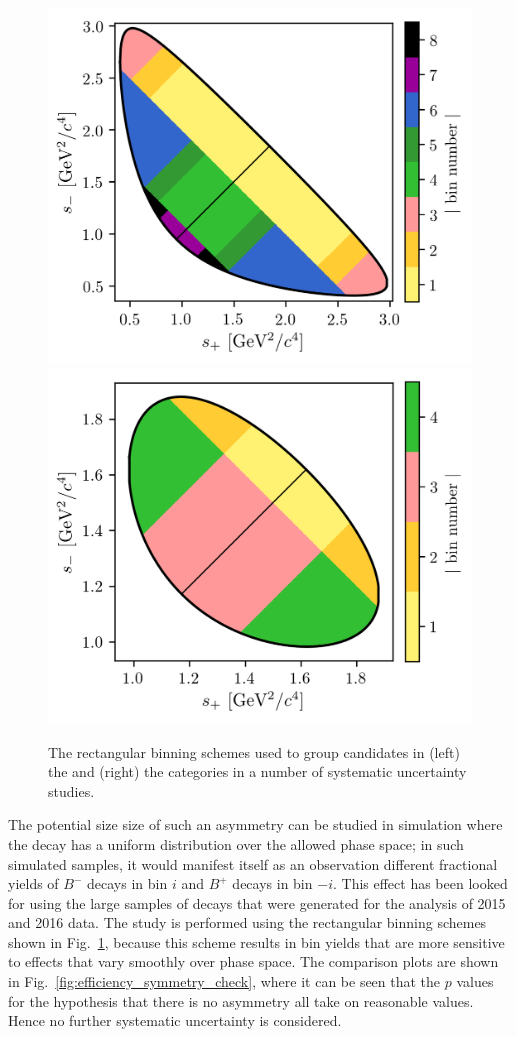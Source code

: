 \begin{figure}[p]
    \centering
    \includegraphics[width=0.45\columnwidth]{figures/theory/binnings/KsPiPi_rect.png}
    \includegraphics[width=0.45\columnwidth]{figures/theory/binnings/KsKK_rect.png}
    \caption{The rectangular binning schemes used to group candidates in (left) the \DtoKspipi and (right) the \DtoKsKK categories in a number of systematic uncertainty studies.}
    \label{fig:rect_bins}
\end{figure}

The potential size size of such an asymmetry can be studied in simulation where the \D decay has a uniform distribution over the allowed phase space; in such simulated samples, it would manifest itself as an observation different fractional yields 
of $B^-$ decays in bin $i$ and $B^+$ decays in bin $-i$. This effect has been looked for using the large samples of \BtoDpi decays that were generated for the analysis of 2015 and 2016 data. The study is performed using the rectangular binning schemes shown in Fig.~\ref{fig:rect_bins}, because this scheme results in bin yields that are more sensitive to effects that vary smoothly over phase space. The comparison plots are shown in Fig.~\ref{fig:efficiency_symmetry_check}, where it can be seen that the $p$ values for the hypothesis that there is no asymmetry all take on reasonable values. Hence no further systematic uncertainty is considered.

